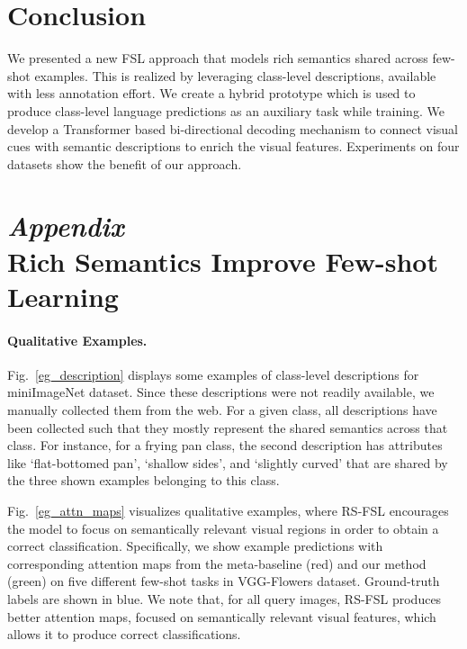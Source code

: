 \documentclass{bmvc2k}
\begin{document}
\vspace{-1em}
\section{Conclusion}
\vspace{-0.5em}
We presented a new FSL approach that models rich semantics shared across few-shot examples. This is realized by leveraging class-level descriptions, available with less annotation effort. We create a hybrid prototype which is used to produce class-level language predictions as an auxiliary task while training. We develop a Transformer based bi-directional decoding mechanism to connect visual cues with semantic  descriptions to enrich the visual features. Experiments on four datasets show the benefit of our approach. 


\newpage

\section*{\textit{Appendix}\\
        \large{Rich Semantics Improve Few-shot Learning}}
        \vspace{0.5em}

\paragraph{Qualitative Examples.}
\noindent Fig.~\ref{eg_description} displays some examples of class-level descriptions for miniImageNet dataset. Since these descriptions were not readily available, we manually collected them from the web. For a given class, all descriptions have been collected such that they mostly represent the shared semantics across that class. For instance, for a frying pan class, the second description has attributes like `flat-bottomed pan', `shallow sides', and `slightly curved' that are shared by the three shown examples belonging to this class. \\
\par
\noindent Fig.~\ref{eg_attn_maps} visualizes qualitative examples, where RS-FSL encourages the model to focus on semantically relevant visual regions in order to obtain a correct classification. Specifically, we show example predictions with corresponding attention maps from the meta-baseline \cite{chen2020new} (red) and our method (green) on five different few-shot tasks in VGG-Flowers dataset. Ground-truth labels are shown in blue. We note that, for all query images, RS-FSL produces better attention maps, focused on semantically relevant visual features, which allows it to produce correct classifications. \\
\end{document}
